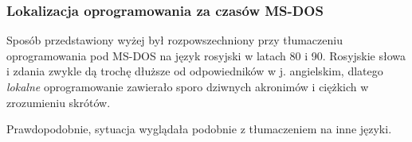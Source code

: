 \subsubsection{Lokalizacja oprogramowania za czasów MS-DOS}

Sposób przedstawiony wyżej był rozpowszechniony przy tłumaczeniu oprogramowania pod MS-DOS na język rosyjski w latach 80 i 90.
Rosyjskie słowa i zdania zwykle dą trochę dłuższe od odpowiedników w j. angielskim, dlatego \emph{lokalne} oprogramowanie zawierało 
sporo dziwnych akronimów i ciężkich w zrozumieniu skrótów.

Prawdopodobnie, sytuacja wyglądała podobnie z tłumaczeniem na inne języki.


